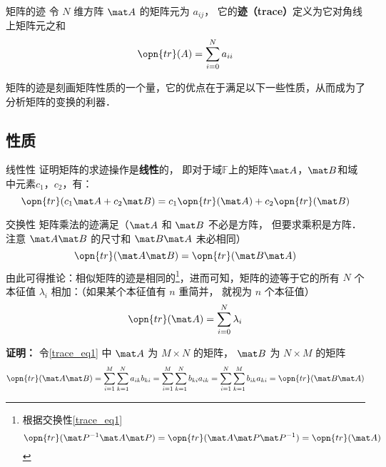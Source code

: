 

\begin{definition}{矩阵的迹}
令 $N$ 维方阵 $\mat A$ 的矩阵元为 $a_{ij}$， 它的\textbf{迹（trace）}定义为它对角线上矩阵元之和
\begin{equation}
\opn{tr}(A) = \sum_{i=0}^N a_{ii}
\end{equation}
\end{definition}

矩阵的迹是刻画矩阵性质的一个量，它的优点在于满足以下一些性质，从而成为了分析矩阵的变换的利器．


\subsection{性质}


\begin{exercise}{线性性}
证明矩阵的求迹操作是\textbf{线性}的， 即对于域$\mathbb{F}$上的矩阵$\mat A$，$\mat B$和域中元素$c_1$，$c_2$，有：
\begin{equation}
\opn{tr}(c_1\mat A+c_2\mat B) = c_1\opn{tr}(\mat A) + c_2\opn{tr}(\mat B)
\end{equation}
\end{exercise}

\begin{example}{交换性}
矩阵乘法的迹满足（$\mat A$ 和 $\mat B$ 不必是方阵， 但要求乘积是方阵． 注意 $\mat A\mat B$ 的尺寸和 $\mat B\mat A$ 未必相同）
\begin{equation}\label{trace_eq1}
\opn{tr}(\mat A\mat B) = \opn{tr}(\mat B\mat A)
\end{equation}
由此可得推论：相似矩阵的迹是相同的\footnote{根据交换性\autoref{trace_eq1} $$\opn{tr}(\mat P^{-1}\mat A\mat P) = \opn{tr}(\mat A\mat P\mat P^{-1}) = \opn{tr}(\mat A)$$}，进而可知，矩阵的迹等于它的所有 $N$ 个本征值 $\lambda_i$ 相加：（如果某个本征值有 $n$ 重简并， 就视为 $n$ 个本征值）
\begin{equation}
\opn{tr}(\mat A) = \sum_{i=0}^N \lambda_i
\end{equation}
\end{example}

\textbf{证明：}
令\autoref{trace_eq1} 中 $\mat A$ 为 $M\times N$ 的矩阵， $\mat B$ 为 $N\times M$ 的矩阵
\begin{equation}
\opn{tr}(\mat A\mat B) = \sum_{i=1}^M \sum_{k=1}^N a_{ik}b_{ki} = \sum_{i=1}^M \sum_{k=1}^N b_{ki}a_{ik} = \sum_{i=1}^N \sum_{k=1}^M b_{ik}a_{ki} = \opn{tr}(\mat B\mat A)
\end{equation}

